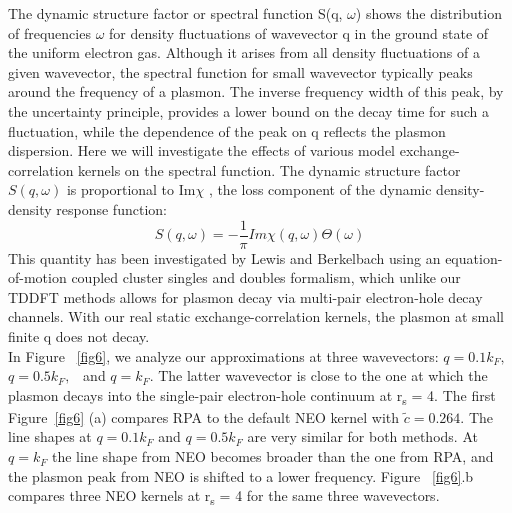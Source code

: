 \documentclass[aps,amsmath,amssymb, preprint, 12pt]{revtex4-1}
\begin{document}
The dynamic structure factor \cite{LP77} or spectral function S(q, $\omega$) shows the distribution of frequencies $\omega$ for density fluctuations of wavevector q in the ground state of the uniform electron gas. Although it arises from all density fluctuations of a given wavevector, the spectral function for small wavevector typically peaks around the frequency of a plasmon. The inverse frequency width of this peak, by the uncertainty principle, provides a lower bound on the decay time for such a fluctuation, while the dependence of the peak on q reflects the plasmon dispersion. Here we will investigate the effects of various model exchange-correlation kernels on the spectral function. The dynamic structure factor  \( S \left( q, \omega  \right)  \)  is proportional to  Im\(\chi\)  \cite{JP85}, the loss component of the dynamic density-density response function:
\begin{equation}
S (q, \omega) = -\frac{1}{\pi} Im\chi(q, \omega) \Theta({\omega})
\end{equation}
This quantity has been investigated by Lewis and Berkelbach \cite{LB19} using an equation-of-motion coupled cluster singles and doubles formalism, which unlike our TDDFT methods allows for plasmon decay via multi-pair electron-hole decay channels. With our real static exchange-correlation kernels, the plasmon at small finite q does not decay.\\

In Figure ~\ref{fig6}, we analyze our approximations at three wavevectors:  \( q=0.1k_{F}, \)   \( q=0.5k_{F}, \) \  and  \( q=k_{F}. \)  The latter wavevector is close to the one at which the plasmon decays into the single-pair electron-hole continuum at r\textsubscript{s} = 4. The first Figure~\ref{fig6} (a) compares RPA to the default NEO kernel with  \( \widetilde{c}=0.264. \)  The line shapes at  \( q=0.1k_{F} \)  and  \( q=0.5k_{F} \)  are very similar for both methods. At  \( q=k_{F} \)  the line shape from NEO becomes broader than the one from RPA, and the plasmon peak from NEO is shifted to a lower frequency. Figure ~\ref{fig6}.b compares three NEO kernels at r\textsubscript{s} = 4 for the same three wavevectors.\\

\end{document}
